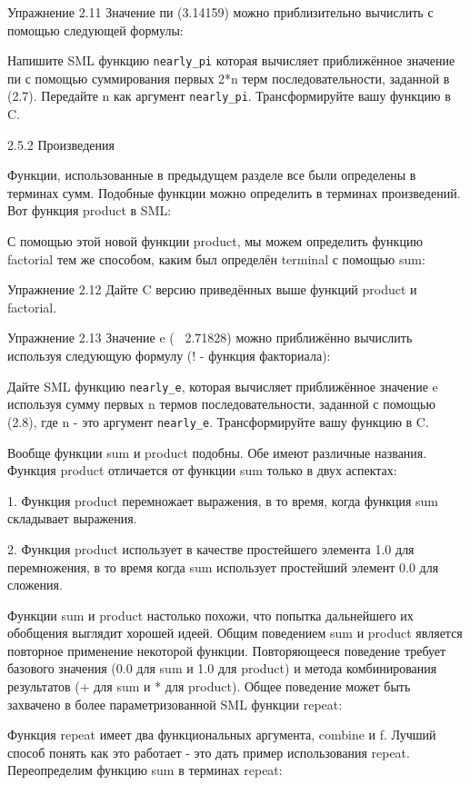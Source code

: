 Упражнение 2.11 Значение пи (3.14159) можно приблизительно вычислить с помощью следующей формулы:

Напишите SML функцию \lstinline|nearly_pi| которая вычисляет приближённое значение пи с помощью суммирования первых 2*n терм последовательности, заданной в (2.7). Передайте n как аргумент \lstinline|nearly_pi|. Трансформируйте вашу функцию в C.

2.5.2 Произведения

Функции, использованные в предыдущем разделе все были определены в терминах сумм. Подобные функции можно определить в терминах произведений. Вот функция product в SML:

С помощью этой новой функции product, мы можем определить функцию factorial тем же способом, каким был определён terminal с помощью sum:

Упражнение 2.12 Дайте C версию приведённых выше функций product и factorial.

Упражнение 2.13 Значение e (~ 2.71828) можно приближённо вычислить используя следующую формулу (! - функция факториала):

Дайте SML функцию \lstinline|nearly_e|, которая вычисляет приближённое значение e используя сумму первых n термов последовательности, заданной с помощью (2.8), где n - это аргумент \lstinline|nearly_e|. Трансформируйте вашу функцию в C.

Вообще функции sum и product подобны. Обе имеют различные названия. Функция product отличается от функции sum только в двух аспектах:

1. Функция product перемножает выражения, в то время, когда функция sum складывает выражения.

2. Функция product использует в качестве простейшего элемента 1.0 для перемножения, в то время когда sum использует простейший элемент 0.0 для сложения.

Функции sum и product настолько похожи, что попытка дальнейшего их обобщения выглядит хорошей идеей. Общим поведением sum и product является повторное применение некоторой функции. Повторяющееся поведение требует базового значения (0.0 для sum и 1.0 для product) и метода комбинирования результатов (+ для sum и * для product). Общее поведение может быть захвачено в более параметризованной SML функции repeat:

Функция repeat имеет два функциональных аргумента, combine и f. Лучший способ понять как это работает - это дать пример использования repeat. Переопределим функцию sum в терминах repeat:

